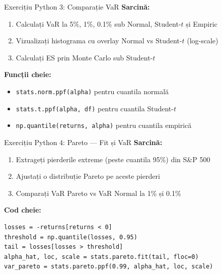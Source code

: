 \documentclass[9pt, aspectratio=169, t]{beamer}
\begin{document}
\begin{frame}[fragile]{Exercițiu Python 3: Comparație VaR}
    \textbf{Sarcină:}
    \begin{enumerate}\setlength{\itemsep}{0pt}
        \item Calculați VaR la 5\%, 1\%, 0.1\% sub Normal, Student-$t$ și Empiric
        \item Vizualizați histograma cu overlay Normal vs Student-$t$ (log-scale)
        \item Calculați ES prin Monte Carlo sub Student-$t$
    \end{enumerate}

    \vspace{0.3cm}
    \textbf{Funcții cheie:}
    \begin{itemize}\setlength{\itemsep}{0pt}
        \item \texttt{stats.norm.ppf(alpha)} pentru cuantila normală
        \item \texttt{stats.t.ppf(alpha, df)} pentru cuantila Student-$t$
        \item \texttt{np.quantile(returns, alpha)} pentru cuantila empirică
    \end{itemize}

\end{frame}

\begin{frame}[fragile]{Exercițiu Python 4: Pareto --- Fit și VaR}
    \textbf{Sarcină:}
    \begin{enumerate}\setlength{\itemsep}{0pt}
        \item Extrageți pierderile extreme (peste cuantila 95\%) din S\&P 500
        \item Ajustați o distribuție Pareto pe aceste pierderi
        \item Comparați VaR Pareto vs VaR Normal la 1\% și 0.1\%
    \end{enumerate}

    \vspace{0.3cm}
    \textbf{Cod cheie:}
    \begin{verbatim}
losses = -returns[returns < 0]
threshold = np.quantile(losses, 0.95)
tail = losses[losses > threshold]
alpha_hat, loc, scale = stats.pareto.fit(tail, floc=0)
var_pareto = stats.pareto.ppf(0.99, alpha_hat, loc, scale)
    \end{verbatim}

\end{frame}
\end{document}
